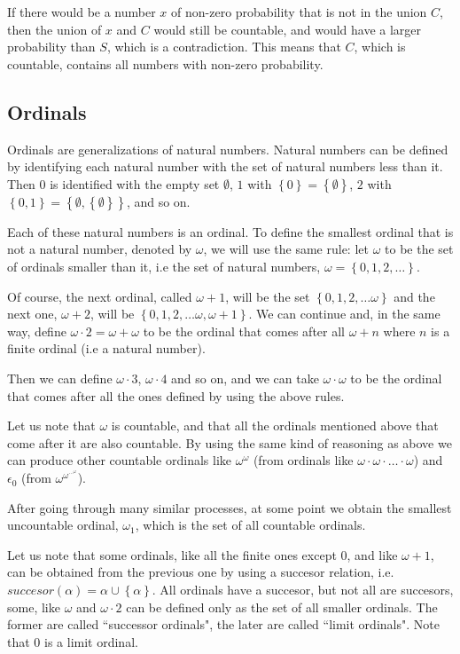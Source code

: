 \documentclass[a4paper
,draft
]{article}
\newcommand{\multime}[1]{\left\{ #1 \right\}}
\newcommand{\ghilimele}[1]{``#1"}
\begin{document}
If there would be a number $x$ of non-zero probability that is not in the
union $C$, then the union of $x$ and $C$ would still be countable, and
would have a larger probability than $S$, which is a contradiction.
This means that $C$, which is countable, contains all numbers with non-zero
probability.

\subsection{Ordinals}
\label{sec:ordinals}

Ordinals are generalizations of natural numbers. Natural numbers can be
defined by identifying each natural number with the set of natural numbers less
than it. Then $0$ is identified with the empty set $\emptyset$,
$1$ with $\multime{0}=\multime{\emptyset}$,
$2$ with $\multime{0, 1}=\multime{\emptyset, \multime{\emptyset}}$,
and so on.

Each of these natural numbers is an ordinal. To define the smallest ordinal
that is not a natural number, denoted by $\omega$, we will use the
same rule: let $\omega$ to be the set of ordinals smaller than it, i.e
the set of natural numbers, $\omega=\multime{0, 1, 2, \dots}$.

Of course, the next ordinal, called $\omega + 1$, will be the set
$\multime{0, 1, 2, \dots \omega}$ and the next one,
$\omega+2$, will be $\multime{0, 1, 2, \dots \omega, \omega+1}$. We can
continue and, in the same way, define $\omega\cdot 2=\omega+\omega$ to be
the ordinal that comes after all $\omega+n$ where $n$ is a finite
ordinal (i.e a natural number).

Then we can define $\omega\cdot 3$, $\omega\cdot 4$ and so on, and we can
take $\omega\cdot \omega$ to be the ordinal that comes after all the ones
defined by using the above rules.

Let us note that $\omega$ is countable, and that all the ordinals mentioned
above that come after it are also countable. By using the same kind of
reasoning as above we can produce other countable ordinals like
$\omega^\omega$ (from ordinals like $\omega\cdot\omega\cdot\dots\cdot\omega$)
and $\epsilon_0$ (from $\omega^{\omega^{\cdots^\omega}}$).

After going through many similar processes, at some point we obtain the
smallest uncountable ordinal, $\omega_1$, which is the set of all
countable ordinals.

Let us note that some ordinals, like all the finite ones except $0$,
and like $\omega+1$, can be obtained from the previous one by using
a succesor relation, i.e. $succesor(\alpha) = \alpha\cup\multime{\alpha}$.
All ordinals have a succesor, but not all are succesors, some, like
$\omega$ and $\omega\cdot 2$ can be defined only as the set of all
smaller ordinals. The former are called \ghilimele{successor ordinals},
the later are called \ghilimele{limit ordinals}. Note that $0$ is a limit
ordinal.
\end{document}
